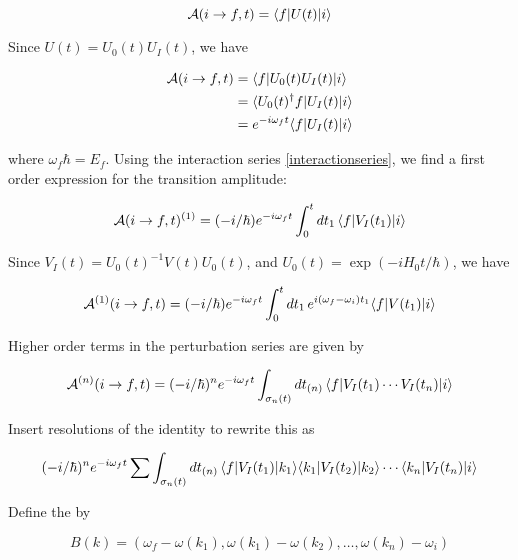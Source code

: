 \begin{equation}
\mathcal{A}(i \to f, t) = \langle f | U(t) | i \rangle
\end{equation}

Since $U(t) = U_0(t)U_I(t)$, we have

\begin{align}
\mathcal{A}(i \to f, t) &= \langle f | U_0(t)U_I(t) | i \rangle \\
&= \langle U_0(t)^\dagger f | U_I(t) | i \rangle \\
&= e^{-i\omega_ft}\langle f | U_I(t) | i \rangle
\end{align}

where $\omega_f \hbar = E_f$.
Using the interaction series \eqref{interactionseries}, we find a first order expression for the transition amplitude:

\begin{equation}
\mathcal{A}(i \to f, t)^{(1)} = (-i/\hbar) e^{-i\omega_ft} \int_0^t dt_1\,  \langle f | V_I(t_1) | i \rangle
\end{equation}

Since $V_I(t) = U_0(t)^{-1}V(t)U_0(t)$, and $U_0(t) = \exp(-iH_0t/\hbar)$, we have

\begin{equation}
\label{firstorderperturbationintegral}
\mathcal{A}^{(1)}(i \to f, t)= (-i/\hbar) e^{-i\omega_ft} \int_0^t dt_1\,  e^{i(\omega_f - \omega_i)t_1}\langle f |  V(t_1)  | i \rangle
\end{equation}

Higher order terms in the perturbation series are given by

\begin{equation}
\mathcal{A}^{(n)}(i \to f, t )= (-i/\hbar)^n e^{-i\omega_ft} \int_{\sigma_n(t)} dt_{(n)}\,  \langle f | V_I(t_1) \cdots  V_I(t_n) | i \rangle
\end{equation}

Insert resolutions of the identity to rewrite this as

\begin{equation}
 (-i/\hbar)^n e^{-i\omega_ft} \sum \int_{\sigma_n(t)} dt_{(n)}\,
\langle f | V_I(t_1) | k_1 \rangle \langle k_1 | V_I(t_2) | k_2 \rangle\cdots  \langle k_n | V_I(t_n) | i \rangle
\end{equation}

Define the  by

\begin{equation}
B(k) = (\omega_f - \omega(k_1), \omega(k_1) - \omega(k_2), \ldots , \omega(k_n) - \omega_i)
\end{equation}

